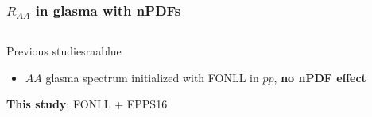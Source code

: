 \documentclass[aspectratio=169,11pt,usenames,dvipsnames]{beamer}
\begin{document}

\begin{frame}
    \frametitle{$R_{AA}$ in glasma with nPDFs}
    \vspace{-15pt}
    \begin{center}
        \begin{columns}[onlytextwidth,t]
           \begin{center}
                \begin{custombox2}{\normalsize Previous studies}{raablue}
                    \small
                    \begin{varwidth}{0.88\textwidth}
                    \begin{itemize}\itemsep0em 
                        \itemsep0em
                        \footnotesize
                        \item $AA$ glasma spectrum initialized with FONLL in $pp$, {\bfseries\color{raablue}no nPDF effect}
                    \end{itemize}
                    \end{varwidth}
                \end{custombox2}
                \begin{untitledcustombox}
                    \begin{varwidth}{0.88\textwidth}
                        \hspace{10pt}\normalsize{\bfseries\color{palteal} This study}: FONLL + {\color{palteal}EPPS16}\hspace{10pt}
                    \end{varwidth}
                \end{untitledcustombox}
            \end{center}


\end{columns}
\end{center}
\end{frame}
\end{document}
